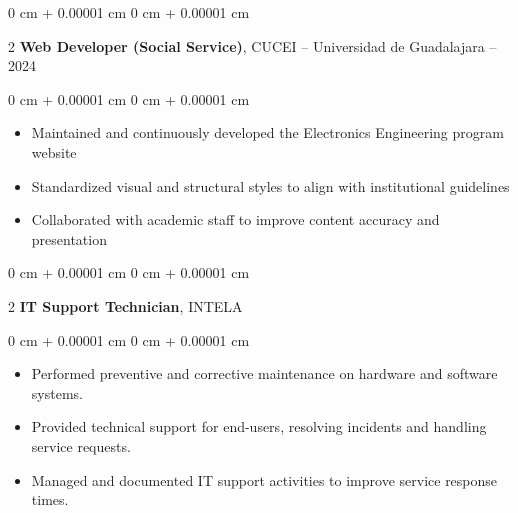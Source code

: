 \documentclass[10pt, letterpaper]{article}
\newenvironment{highlights}{
    \begin{itemize}[
        topsep=0.10 cm,
        parsep=0.10 cm,
        partopsep=0pt,
        itemsep=0pt,
        leftmargin=0 cm + 10pt
    ]
}{
    \end{itemize}
} %
\newenvironment{highlightsforbulletentries}{
    \begin{itemize}[
        topsep=0.10 cm,
        parsep=0.10 cm,
        partopsep=0pt,
        itemsep=0pt,
        leftmargin=10pt
    ]
}{
    \end{itemize}
} %
\newenvironment{onecolentry}{
    \begin{adjustwidth}{
        0 cm + 0.00001 cm
    }{
        0 cm + 0.00001 cm
    }
}{
    \end{adjustwidth}
} %
\newenvironment{twocolentry}[2][]{
    \onecolentry
    \def\secondColumn{#2}
    \setcolumnwidth{\fill, 4.5 cm}
    \begin{paracol}{2}
}{
    \switchcolumn \raggedleft \secondColumn
    \end{paracol}
    \endonecolentry
} %
\begin{document}
    \begin{twocolentry}{ 2023 -- 2024 } \textbf{Web Developer (Social Service)}, CUCEI – Universidad de Guadalajara \end{twocolentry} \vspace{0.10 cm} \begin{onecolentry} \begin{highlights} \item Maintained and continuously developed the Electronics Engineering program website \item Standardized visual and structural styles to align with institutional guidelines \item Collaborated with academic staff to improve content accuracy and presentation \end{highlights} \end{onecolentry} \vspace{0.2 cm}

        \begin{twocolentry}{2022}%
            \textbf{IT Support Technician},
            INTELA
        \end{twocolentry}
        \vspace{0.10 cm}
        \begin{onecolentry}
            \begin{highlightsforbulletentries}
                \item Performed preventive and corrective maintenance on hardware and software systems.
                \item Provided technical support for end-users, resolving incidents and handling service requests.
                \item Managed and documented IT support activities to improve service response times.
            \end{highlightsforbulletentries}%
        \end{onecolentry}
        \vspace{0.2 cm}
    
\end{document}
